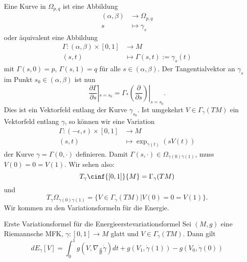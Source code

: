 Eine Kurve in $\Omega_{p,q}$ ist eine Abbildung
\begin{align}
(\alpha, \beta) &\to \Omega_{p,q}\\
s &\mapsto \gamma_s
\end{align}
oder äquivalent eine Abbildung
\begin{align}
\Gamma: (\alpha, \beta) \times [0,1] &\to M\\
(s,t) &\mapsto \Gamma(s,t):=\gamma_s(t)
\end{align}
mit $\Gamma(s,0)=p$, $\Gamma(s,1)=q$ für alle $s \in (\alpha, \beta)$. Der Tangentialvektor an $\gamma_s$ im Punkt $s_0 \in (\alpha, \beta)$ ist nun
\begin{equation}
\frac{\partial \Gamma}{\partial s}|_{s=s_0} = \Gamma_\ast(\frac{\partial}{\partial s})|_{s=s_0}.
\end{equation}
Dies ist ein Vektorfeld entlang der Kurve $\gamma_{s_0}$. Ist umgekehrt $V \in \Gamma_\gamma(TM)$ ein Vektorfeld entlang $\gamma$, so können wir eine Variation 
\begin{align}
\Gamma: (-\epsilon, \epsilon) \times [0,1] &\to M\\
(s,t) &\mapsto \exp_{\gamma(t)}(sV(t))
\end{align}
der Kurve $\gamma = \Gamma(0, \cdot)$ definieren. Damit $\Gamma(s, \cdot) \in \Omega_{\gamma(0)\gamma(1)}$, muss $V(0)=0=V(1)$. Wir sehen also:
\begin{equation}
T_\gamma \cinf{[0,1]}{M} = \Gamma_\gamma(TM)
\end{equation}
und
\begin{equation}
T_\gamma \Omega_{\gamma(0)\gamma(1)} = \{ V \in \Gamma_\gamma (TM) | V(0)=0=V(1) \}.
\end{equation}
Wir kommen zu den Variationsformeln für die Energie.
\begin{satz}{Erste Variationsformel für die Energie}{erstevariationsformel}
Sei $(M,g)$ eine Riemannsche MFK, $\gamma: [0,1] \to M$ glatt und $V \in \Gamma_\gamma(TM)$. Dann gilt
\begin{equation}
dE_\gamma[V] = \int_0^1 g(V, \nabla_\frac{d}{dt} \dot{\gamma})dt + g(V_1, \dot{\gamma}(1))-g(V_0, \dot{\gamma}(0))
\end{equation}
\end{satz}
